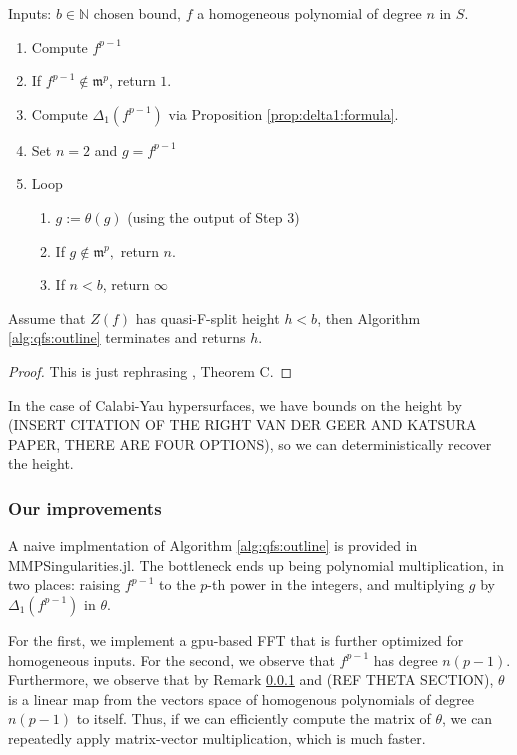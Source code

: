 \begin{alg}
	\label{alg:qfs:outline}

	Inputs: \(b \in \mathbb{N}\) chosen bound, \(f\) a homogeneous
	polynomial of degree \(n\) in \(S\).
	\begin{enumerate}[(1)]
		\item Compute \(f^{p-1}\)
		\item If \(f^{p-1} \notin \mathfrak{m}^{p}\), return \(1\). 
		\item Compute \(\Delta_{1}(f^{p-1})\) via Proposition \ref{prop:delta1:formula}.
		\item Set \(n = 2\) and \(g = f^{p-1}\)
		\item Loop
			\begin{enumerate}[(1)]
				\item \(g := \theta(g)\) (using the output of Step 3)
				\item If \(g \notin \mathfrak{m}^{p},\) return \(n\).
				\item If \(n < b\), return \(\infty\)	
			\end{enumerate}
	\end{enumerate}
\end{alg}

\begin{thm}
	Assume that
	\(Z(f)\) has quasi-F-split height \(h < b\),
	then Algorithm \ref{alg:qfs:outline} terminates
	and returns \(h\).
\end{thm}

\begin{proof}
	This is just rephrasing \cite{quasifedder}, Theorem C.
\end{proof}

In the case of Calabi-Yau hypersurfaces, we have bounds on the height by
(INSERT CITATION OF THE RIGHT VAN DER GEER AND KATSURA PAPER, THERE ARE FOUR OPTIONS), 
so we can deterministically recover the height.  

\subsubsection{Our improvements}

A naive implmentation of Algorithm \ref{alg:qfs:outline}
is provided in MMPSingularities.jl.
The bottleneck ends up being polynomial multiplication, 
in two places:
raising \(f^{p-1}\) to the \(p\)-th power in the integers,
and multiplying \(g\) by \(\Delta_{1}(f^{p-1})\) 
in \(\theta\).

For the first, we implement a gpu-based FFT that is
further optimized for homogeneous inputs.
For the second, we observe that \(f^{p-1}\) has degree
\(n(p-1)\). 
Furthermore, we observe that by Remark \ref{} and 
(REF THETA SECTION), \(\theta\) is a linear map
from the vectors space of 
homogenous polynomials of degree \(n(p-1)\) 
to itself.
Thus, if we can efficiently compute the matrix of \(\theta\),
we can repeatedly apply matrix-vector multiplication,
which is much faster.


